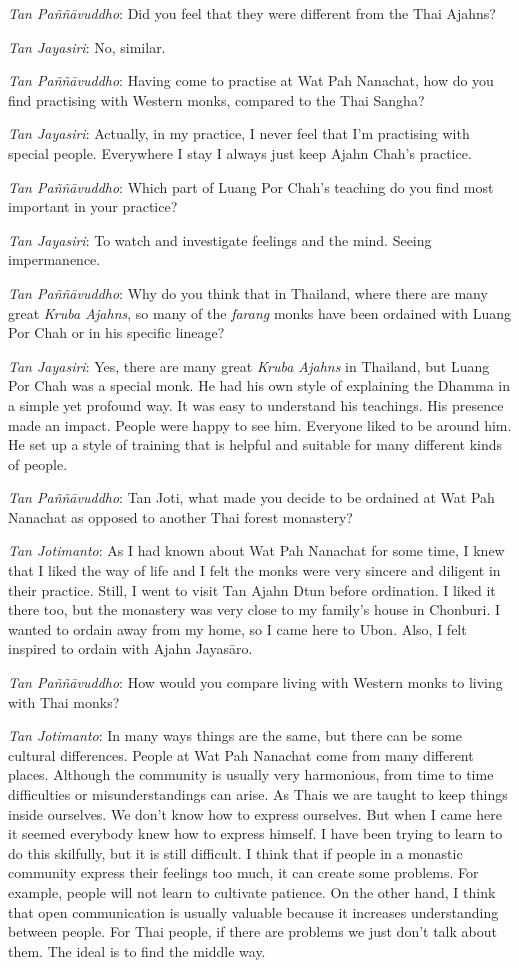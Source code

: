 \emph{Tan Paññāvuddho}: Did you feel that they were different from the
Thai Ajahns? 

\emph{Tan Jayasiri}: No, similar. 

\emph{Tan Paññāvuddho}: Having come to practise at Wat Pah Nanachat, 
how do you find practising with Western monks, compared to the Thai
Sangha? 

\emph{Tan Jayasiri}: Actually, in my practice, I never feel that I'm
practising with special people. Everywhere I stay I always just keep
Ajahn Chah's practice. 

\emph{Tan Paññāvuddho}: Which part of Luang Por Chah's teaching do you
find most important in your practice? 

\emph{Tan Jayasiri}: To watch and investigate feelings and the mind. 
Seeing impermanence. 

\emph{Tan Paññāvuddho}: Why do you think that in Thailand, where there
are many great \emph{Kruba Ajahns}, so many of the \emph{farang} monks
have been ordained with Luang Por Chah or in his specific lineage? 

\emph{Tan Jayasiri}: Yes, there are many great \emph{Kruba Ajahns}
in Thailand, but Luang Por Chah was a special monk. He had
his own style of explaining the Dhamma in a simple yet profound way. It
was easy to understand his teachings. His presence made an impact. 
People were happy to see him. Everyone liked to be around him. He set up
a style of training that is helpful and suitable for many different
kinds of people. 

\emph{Tan Paññāvuddho}: Tan Joti, what made you decide to be ordained
at Wat Pah Nanachat as opposed to another Thai forest monastery? 

\emph{Tan Jotimanto}: As I had known about Wat Pah Nanachat for some
time, I knew that I liked the way of life and I felt the monks were very
sincere and diligent in their practice. Still, I went to visit Tan Ajahn
Dtun before ordination. I liked it there too, but the monastery was very
close to my family's house in Chonburi. I wanted to ordain away from my
home, so I came here to Ubon. Also, I felt inspired to ordain with Ajahn
Jayasāro. 

\emph{Tan Paññāvuddho}: How would you compare living with Western monks
to living with Thai monks? 

\emph{Tan Jotimanto}: In many ways things are the same, but there can be
some cultural differences. People at Wat Pah Nanachat come from many
different places. Although the community is usually very harmonious, 
from time to time difficulties or misunderstandings can arise. As Thais
we are taught to keep things inside ourselves. We don't know how to
express ourselves. But when I came here it seemed everybody knew how to
express himself. I have been trying to learn to do this skilfully, but
it is still difficult. I think that if people in a monastic community
express their feelings too much, it can create some problems. For
example, people will not learn to cultivate patience. On the other hand, 
I think that open communication is usually valuable because it increases
understanding between people. For Thai people, if there are problems we
just don't talk about them. The ideal is to find the middle way. 

